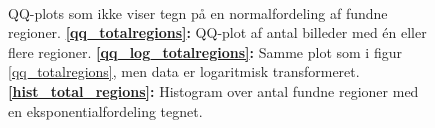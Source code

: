 {\begin{figure}[!h]
    \centering
    \\
    \caption[]{QQ-plots som ikke viser tegn på en normalfordeling af
    fundne regioner. \textbf{\ref{qq_totalregions}:} QQ-plot af antal
    billeder med én eller flere regioner.
    \textbf{\ref{qq_log_totalregions}:} Samme plot som i figur
    \ref{qq_totalregions}, men data er logaritmisk transformeret.
    \textbf{\ref{hist_total_regions}:} Histogram over antal fundne
    regioner med en eksponentialfordeling tegnet.}
    \label{qq_plots}
\end{figure}

}

